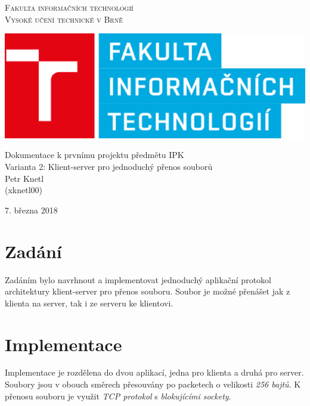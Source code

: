 \documentclass[a4paper, 12pt]{article}
\begin{document}
\begin{center} 
\thispagestyle{empty}
\Huge
\textsc{Fakulta informačních technologií\\Vysoké učení
technické v Brně}\\

\includegraphics[scale = 0.5]{fit-logo.eps}


\LARGE Dokumentace k prvnímu projektu předmětu IPK\\
\Huge Varianta 2: Klient-server pro jednoduchý přenos souborů \\
\Huge
Petr Knetl  \\
\LARGE
(xknetl00)
\end{center}
{\LARGE \hfill
7. března 2018}

\newpage

\tableofcontents
{}
\thispagestyle{empty}
\setcounter{page}{1}
\newpage

\section{Zadání}
Zadáním bylo navrhnout a implementovat jednoduchý aplikační protokol architektury klient-server pro přenos souboru. Soubor je možné přenášet jak z klienta na server, tak i ze serveru ke klientovi.

\section{Implementace}
Implementace je rozdělena do dvou aplikací, jedna pro klienta a druhá pro server. Soubory jsou v obouch směrech přesouvány po packetech o velikosti \emph{256 bajtů}. K přenosu souboru je využit \emph{TCP protokol} s \emph{blokujícími sockety}.
\end{document}
